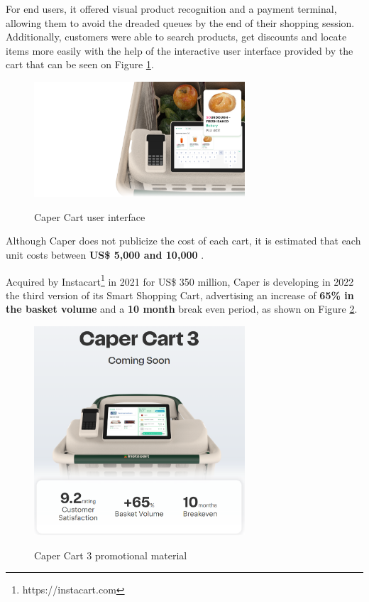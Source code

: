 For end users, it offered visual product recognition and a payment terminal,
allowing them to avoid the dreaded queues by the end of their shopping session.
Additionally, customers were able to search products, get discounts and locate
items more easily with the help of the interactive user interface provided by the cart that 
can be seen on Figure \ref{fig:caperui}.

\begin{figure}[H]
	\centering
	\caption[Caper Cart user interface]{Caper Cart user interface}
	\includegraphics[width=0.7\textwidth]{./images/capercartui.png}
	\label{fig:caperui}
\end{figure}

Although Caper does not publicize the cost of each cart, it is estimated that each unit costs between
\textbf{US\$ 5,000 and 10,000} \cite{TWP2021}.

Acquired by Instacart\footnote{https://instacart.com} in 2021 for US\$ 350
million, Caper is developing in 2022 the third version of its Smart Shopping
Cart, advertising an increase of \textbf{65\% in the basket volume} and a
\textbf{10 month} break even period, as shown on Figure \ref{fig:caperad}.

\begin{figure}[H]
	\centering
	\caption[Caper Cart 3 promotional material]{Caper Cart 3 promotional material}
	\includegraphics[width=0.7\textwidth]{./images/capercart3.png}
	\label{fig:caperad}
\end{figure}


